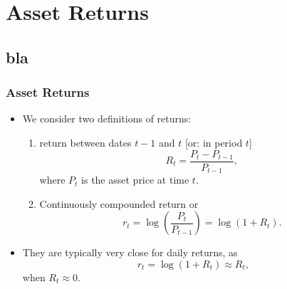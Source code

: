 

\frame{\titlepage}


\section{Asset Returns}\subsection*{bla}
\begin{frame}
\frametitle{Asset Returns}
\begin{itemize}
\item We consider two definitions of returns:
\begin{enumerate}
 \item {} return between dates $t-1$ and $t$ [or: in period $t$]
\[
 R_{t} = \frac{P_{t} - P_{t-1}}{P_{t-1}},
\]
where $P_{t}$ is the asset price at time $t$.

\item Continuously compounded return or 
\[
 r_{t} = \log \left ( \frac{P_{t}}{P_{t-1}}  \right ) = \log(1+R_{t}).
\]
\end{enumerate}

\item They are typically very close for daily returns, as
\[
 r_{t} = \log(1+R_{t}) \approx R_{t},
\]
when $R_{t} \approx 0$.
\end{itemize}
\end{frame}

